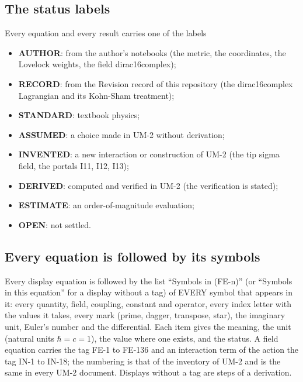 \documentclass[
  10pt,
]{article}
\providecommand{\tightlist}{%
  \setlength{\itemsep}{0pt}\setlength{\parskip}{0pt}}
\begin{document}
\hypertarget{the-status-labels}{%
\subsection{The status labels}\label{the-status-labels}}

Every equation and every result carries one of the labels

\begin{itemize}
\tightlist
\item
  \textbf{AUTHOR}: from the author's notebooks (the metric, the
  coordinates, the Lovelock weights, the field dirac16complex);
\item
  \textbf{RECORD}: from the Revision record of this repository (the
  dirac16complex Lagrangian and its Kohn-Sham treatment);
\item
  \textbf{STANDARD}: textbook physics;
\item
  \textbf{ASSUMED}: a choice made in UM-2 without derivation;
\item
  \textbf{INVENTED}: a new interaction or construction of UM-2 (the tip
  sigma field, the portals I11, I12, I13);
\item
  \textbf{DERIVED}: computed and verified in UM-2 (the verification is
  stated);
\item
  \textbf{ESTIMATE}: an order-of-magnitude evaluation;
\item
  \textbf{OPEN}: not settled.
\end{itemize}

\hypertarget{every-equation-is-followed-by-its-symbols}{%
\subsection{Every equation is followed by its
symbols}\label{every-equation-is-followed-by-its-symbols}}

Every display equation is followed by the list ``Symbols in (FE-n)'' (or
``Symbols in this equation'' for a display without a tag) of EVERY
symbol that appears in it: every quantity, field, coupling, constant and
operator, every index letter with the values it takes, every mark
(prime, dagger, transpose, star), the imaginary unit, Euler's number and
the differential. Each item gives the meaning, the unit (natural units
\(\hbar = c = 1\)), the value where one exists, and the status. A field
equation carries the tag FE-1 to FE-136 and an interaction term of the
action the tag IN-1 to IN-18; the numbering is that of the inventory of
UM-2 and is the same in every UM-2 document. Displays without a tag are
steps of a derivation.
\end{document}
